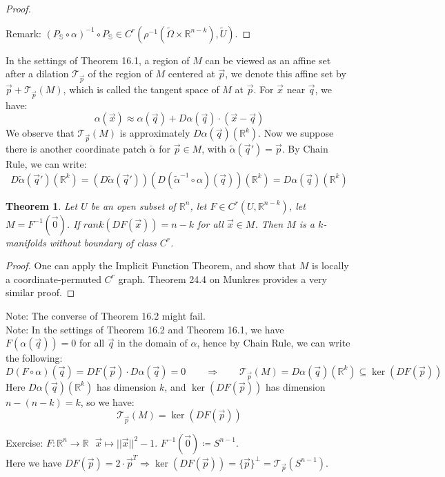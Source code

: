 \documentclass[11pt,oneside]{book}
\theoremstyle{break}
\theoremstyle{break}
\newtheorem{thm}{Theorem}[section]
\newcommand{\R}{\mathbb{R}}
\newcommand{\T}{\mathcal{T}}
\newcommand{\that}[1]{\widetilde{#1}}
\newcommand{\note}{\color{red}Note: \color{black}}
\newcommand{\remark}{\color{blue}Remark: \color{black}}
\newcommand{\exercise}{\color{green}Exercise: \color{black}}
\begin{document}
\begin{proof}
\begin{center}
\end{center}
\remark $(P_\mathbb{S} \circ \alpha)^{-1} \circ P_\mathbb{S} \in C^r(\rho^{-1}(\widetilde{\Omega}\times \R^{n-k} ),\widetilde{U})$.
\end{proof} 
 
In the settings of Theorem 16.1, a region of $M$ can be viewed as an affine set after a  dilation $\T_{\vec{p}}$ of the region of $M$ centered at $\vec{p}$, we denote this affine set by $\vec{p} + \T_{\vec{p}}(M)$, which is called the tangent space of $M$ at $\vec{p}$. For $\vec{x}$ near $\vec{q}$, we have:
$$\alpha(\vec{x}) \approx \alpha(\vec{q}) + D\alpha(\vec{q}) \cdot (\vec{x}-\vec{q})$$
We observe that $\T_{\vec{p}}(M)$ is approximately $D\alpha(\vec{q}) (\R^k)$. Now we suppose there is another coordinate patch $\that{\alpha}$ for $\vec{p}\in M$, with $\that{\alpha}(\vec{q}') = \vec{p}$. By Chain Rule, we can write:
$$D\that{\alpha}(\vec{q}')(\R^k) = (D\that{\alpha}(\vec{q}'))(D(\that{\alpha}^{-1}\circ \alpha )(\vec{q}))(\R^k) = D\alpha(\vec{q})(\R^k)$$

\begin{thm}
Let $U$ be an open subset of $\R^n$, let $F \in C^r(U,\R^{n-k})$, let $M = F^{-1}(\vec{0})$. If $rank(DF(\vec{x})) = n-k$ for all $\vec{x}\in M$. Then $M$ is a $k$-manifolds without boundary of class $C^r$.
\end{thm}
\begin{proof}
One can apply the Implicit Function Theorem, and show that $M$ is locally a coordinate-permuted $C^r$ graph. Theorem 24.4 on Munkres provides a very similar proof.
\end{proof}

\note The converse of Theorem 16.2 might fail.\\
\note In the settings of Theorem 16.2 and Theorem 16.1, we have $F(\alpha(\vec{q})) = 0$ for all $\vec{q}$ in the domain of $\alpha$, hence by Chain Rule, we can write the following:
$$D(F\circ \alpha)(\vec{q}) = DF(\vec{p})\cdot D\alpha(\vec{q}) = 0 \qquad \Rightarrow \qquad \T_{\vec{p}}(M) = D\alpha(\vec{q})(\R^k) \subseteq \ker (DF(\vec{p}))$$
Here $D\alpha(\vec{q})(\R^k) $ has dimension $k$, and $\ker (DF(\vec{p}))$ has dimension $n-(n-k)= k$, so we have: 
$$\T_{\vec{p}}(M) = \ker (DF(\vec{p}))$$


\exercise $F:\R^n \to \R \ \ \ \vec{x}\mapsto ||\vec{x}||^2 -1$. $F^{-1}(\vec{0})\coloneqq S^{n-1}$.\\
Here we have $DF(\vec{p}) = 2\cdot \vec{p}^T\Rightarrow \ker(DF(\vec{p})) = \{\vec{p}\}^\perp= \T_{\vec{p}}(S^{n-1})$.\\
\end{document}
